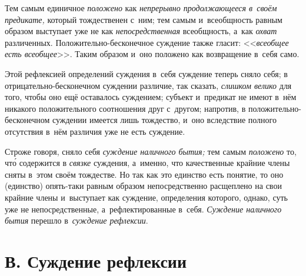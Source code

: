 Тем самым единичное {\em положено} как {\em непрерывно продолжающееся в~своём
предикате,} который тождественен с~ним; тем самым и~всеобщность равным образом
выступает уже не как {\em непосредственная} всеобщность, а~как {\em охват}
различенных. Положительно-бесконечное суждение также гласит: <<{\em всеобщее
есть всеобщее}>>. Таким образом и~оно положено как возвращение в~себя само.

Этой рефлексией определений суждения в~себя суждение теперь сняло себя; в
отрицательно-бесконечном суждении различие, так сказать, {\em слишком велико}
для того, чтобы оно ещё оставалось суждением; субъект и~предикат не имеют в~нём
никакого положительного соотношения друг с~другом; напротив, в
положительно-бесконечном суждении имеется лишь тождество, и~оно вследствие
полного отсутствия в~нём различия уже не есть суждение.

Строже говоря, сняло себя {\em суждение наличного бытия;} тем самым {\em
положено} то, чт\'{о} содержится в {\em связке} суждения, а~именно,
что качественные крайние члены сняты в~этом своём тождестве. Но так
как это единство есть понятие, то оно (единство) опять-таки равным образом
непосредственно расщеплено на свои крайние члены и~выступает как суждение,
определения которого, однако, суть уже не непосредственные, а~рефлектированные
в~себя. {\em Суждение наличного бытия} перешло в~{\em суждение рефлексии}.

\section[В. Суждение рефлексии]{В. Суждение рефлексии}

